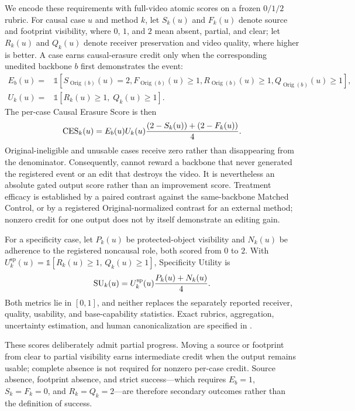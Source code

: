 We encode these requirements with full-video atomic scores on a frozen
$0/1/2$ rubric. For causal case $u$ and method $k$, let $S_k(u)$ and $F_k(u)$
denote source and footprint visibility, where $0$, $1$, and $2$ mean absent,
partial, and clear; let $R_k(u)$ and $Q_k(u)$ denote receiver preservation and
video quality, where higher is better. A case earns causal-erasure credit only
when the corresponding unedited backbone $b$ first demonstrates the event:
\begin{align}
E_b(u)={}&\mathbb{1}\!\left[S_{\operatorname{Orig}(b)}(u)=2,
F_{\operatorname{Orig}(b)}(u)\geq 1,
R_{\operatorname{Orig}(b)}(u)\geq 1,
Q_{\operatorname{Orig}(b)}(u)\geq 1\right], \\
U_k(u)={}&\mathbb{1}\!\left[R_k(u)\geq 1,\;Q_k(u)\geq 1\right].
\label{eq:eligibility-usability}
\end{align}
The per-case Causal Erasure Score is then
\begin{equation}
\mathrm{CES}_k(u)=E_b(u)U_k(u)
\frac{(2-S_k(u))+(2-F_k(u))}{4}.
\label{eq:ces}
\end{equation}
Original-ineligible and unusable cases receive zero rather than disappearing
from the denominator. Consequently, \ces{} cannot reward a backbone that never
generated the registered event or an edit that destroys the video.
It is nevertheless an absolute gated output score rather than an improvement
score. Treatment efficacy is established by a paired \ces{} contrast against
the same-backbone Matched Control, or by a registered Original-normalized
contrast for an external method; nonzero credit for one output does not by
itself demonstrate an editing gain.

For a specificity case, let $P_k(u)$ be protected-object visibility and
$N_k(u)$ be adherence to the registered noncausal role, both scored from $0$
to $2$. With
$U_k^{\mathrm{sp}}(u)=\mathbb{1}[R_k(u)\geq1,\,Q_k(u)\geq1]$, Specificity
Utility is
\begin{equation}
\mathrm{SU}_k(u)=U_k^{\mathrm{sp}}(u)\frac{P_k(u)+N_k(u)}{4}.
\label{eq:su}
\end{equation}
Both metrics lie in $[0,1]$, and neither replaces the separately reported
receiver, quality, usability, and base-capability statistics. Exact rubrics,
aggregation, uncertainty estimation, and human canonicalization are specified
in .

These scores deliberately admit partial progress. Moving a source or
footprint from clear to partial visibility earns intermediate credit when the
output remains usable; complete absence is not required for nonzero per-case
credit. Source absence, footprint absence, and strict success---which requires
$E_b=1$, $S_k=F_k=0$, and $R_k=Q_k=2$---are therefore secondary outcomes
rather than the definition of success.
